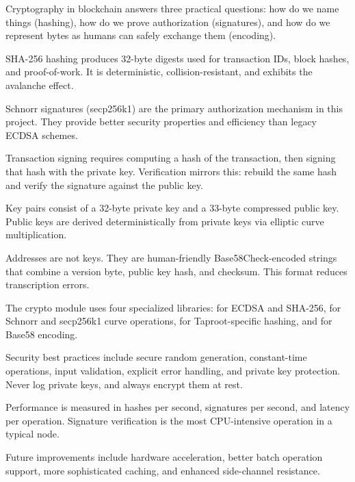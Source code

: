 \begin{chaptersummary}
\item Cryptography in blockchain answers three practical questions: how do we name things (hashing), how do we prove authorization (signatures), and how do we represent bytes as humans can safely exchange them (encoding).

\item SHA-256 hashing produces 32-byte digests used for transaction IDs, block hashes, and proof-of-work. It is deterministic, collision-resistant, and exhibits the avalanche effect.

\item Schnorr signatures (secp256k1) are the primary authorization mechanism in this project. They provide better security properties and efficiency than legacy ECDSA schemes.

\item Transaction signing requires computing a hash of the transaction, then signing that hash with the private key. Verification mirrors this: rebuild the same hash and verify the signature against the public key.

\item Key pairs consist of a 32-byte private key and a 33-byte compressed public key. Public keys are derived deterministically from private keys via elliptic curve multiplication.

\item Addresses are not keys. They are human-friendly Base58Check-encoded strings that combine a version byte, public key hash, and checksum. This format reduces transcription errors.

\item The crypto module uses four specialized libraries:  for ECDSA and SHA-256,  for Schnorr and secp256k1 curve operations,  for Taproot-specific hashing, and  for Base58 encoding.

\item Security best practices include secure random generation, constant-time operations, input validation, explicit error handling, and private key protection. Never log private keys, and always encrypt them at rest.

\item Performance is measured in hashes per second, signatures per second, and latency per operation. Signature verification is the most CPU-intensive operation in a typical node.

\item Future improvements include hardware acceleration, better batch operation support, more sophisticated caching, and enhanced side-channel resistance.
\end{chaptersummary}

